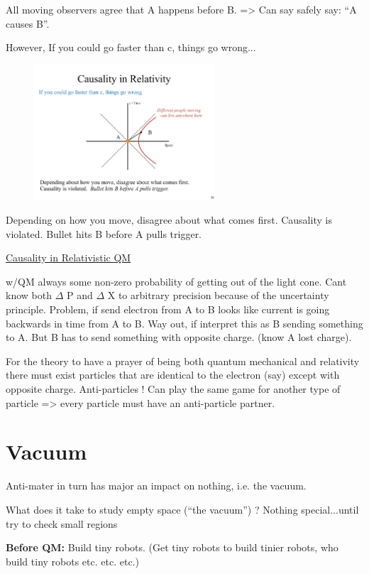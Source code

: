 {All moving observers agree that A happens before B. => Can say safely say: ``A causes B''.


However, If you could go faster than c, things go wrong...
\begin{figure}[h]
\centering
\includegraphics[width=0.6\textwidth]{./CausalitySpacelike.pdf}
\end{figure}

Depending on how you move, disagree about what comes first. Causality is violated. Bullet hits B before A pulls trigger.

\clearpage
\underline{Causality in Relativistic QM}

w/QM always some non-zero probability of getting out of the light cone.
Cant know both $\Delta$ P and $\Delta$ X to arbitrary precision because of the uncertainty principle.
Problem, if send electron from A to B looks like current is going backwards in time from A to B.
Way out, if interpret this as B sending something to A.
But B has to send something with opposite charge. (know A lost charge).

For the theory to have a prayer of being both quantum mechanical and relativity there must exist particles that are identical to the electron (say) except with opposite charge.
Anti-particles !
Can play the same game for another type of particle => every particle must have an anti-particle partner.

\section{Vacuum}
Anti-mater in turn has major an impact on nothing, i.e. the vacuum.

What does it take to study empty space (“the vacuum”) ?
Nothing special...until try to check small regions

\textbf{Before QM:}
Build tiny robots. (Get tiny robots to build tinier robots, who build tiny robots etc. etc. etc.)

}
